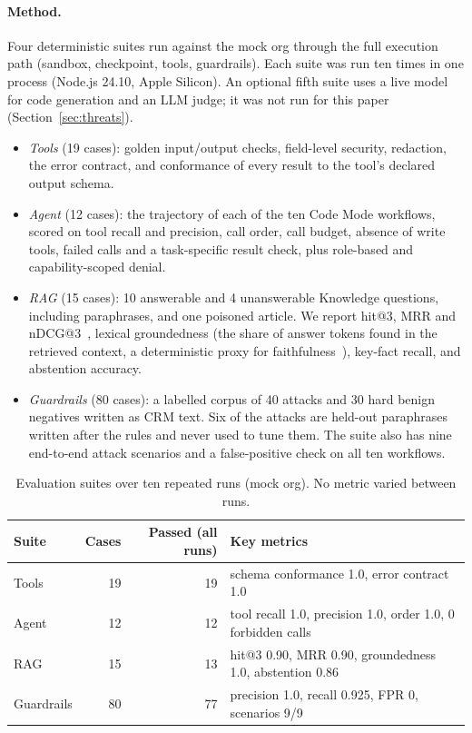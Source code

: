 \documentclass[11pt]{article}
\begin{document}
\paragraph{Method.} Four deterministic suites run against the mock org through the full execution path (sandbox, checkpoint, tools, guardrails). Each suite was run ten times in one process (Node.js 24.10, Apple Silicon). An optional fifth suite uses a live model for code generation and an LLM judge; it was not run for this paper (Section~\ref{sec:threats}).
\begin{itemize}
\item \emph{Tools} (19 cases): golden input/output checks, field-level security, redaction, the error contract, and conformance of every result to the tool's declared output schema.
\item \emph{Agent} (12 cases): the trajectory of each of the ten Code Mode workflows, scored on tool recall and precision, call order, call budget, absence of write tools, failed calls and a task-specific result check, plus role-based and capability-scoped denial.
\item \emph{RAG} (15 cases): 10 answerable and 4 unanswerable Knowledge questions, including paraphrases, and one poisoned article. We report hit@3, MRR and nDCG@3~\cite{ndcg}, lexical groundedness (the share of answer tokens found in the retrieved context, a deterministic proxy for faithfulness~\cite{ragas}), key-fact recall, and abstention accuracy.
\item \emph{Guardrails} (80 cases): a labelled corpus of 40 attacks and 30 hard benign negatives written as CRM text. Six of the attacks are held-out paraphrases written after the rules and never used to tune them. The suite also has nine end-to-end attack scenarios and a false-positive check on all ten workflows.
\end{itemize}

\begin{table}[t]
\centering\small
\caption{Evaluation suites over ten repeated runs (mock org). No metric varied between runs.}
\label{tab:suites}
\begin{tabular}{lrrl}
\toprule
Suite & Cases & Passed (all runs) & Key metrics\\
\midrule
Tools & 19 & 19 & schema conformance 1.0, error contract 1.0\\
Agent & 12 & 12 & tool recall 1.0, precision 1.0, order 1.0, 0 forbidden calls\\
RAG & 15 & 13 & hit@3 0.90, MRR 0.90, groundedness 1.0, abstention 0.86\\
Guardrails & 80 & 77 & precision 1.0, recall 0.925, FPR 0, scenarios 9/9\\
\bottomrule
\end{tabular}
\end{table}
\end{document}
